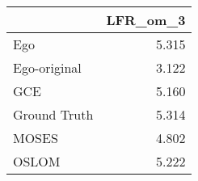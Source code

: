 \begin{tabular}{lr}
\toprule
{} & LFR_om_3 \\
\midrule
Ego          &    5.315 \\
Ego-original &    3.122 \\
GCE          &    5.160 \\
Ground Truth &    5.314 \\
MOSES        &    4.802 \\
OSLOM        &    5.222 \\
\bottomrule
\end{tabular}
